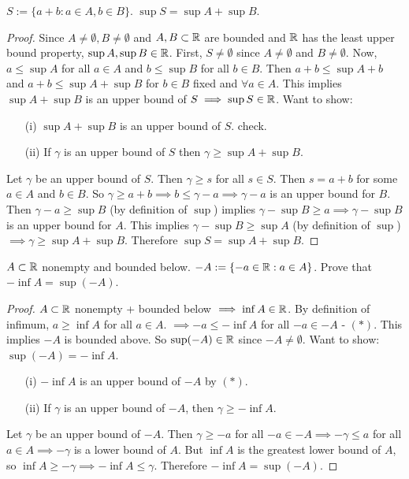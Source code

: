 \documentclass[]{article}
\begin{document}
\begin{example}
	[HW2.2] $S:=\{a+b:a\in A,b\in B\}$. $\sup S = \sup A + \sup B$.
	\begin{proof}
		Since $A\neq\emptyset,B\neq\emptyset$ and $A,B\subset \mathbb{R}$ are bounded and $\mathbb{R}$ has the least upper bound property, $\sup A,\sup B\in\mathbb{R}$.
		First, $S\neq\emptyset$ since $A\neq\emptyset$ and $B\neq\emptyset$. Now, $a\leq \sup A$ for all $a\in A$ and $b\leq \sup B$ for all $b\in B$.
		Then $a+b\leq\sup A+b$ and $a+b\leq \sup A + \sup B$ for $b\in B$ fixed and $\forall a\in A$. 
		This implies $\sup A+\sup B$ is an upper bound of $S \implies \sup S\in\mathbb{R}$.
		Want to show:
		\begin{enumerate}
			\item[(i)] $\sup A+\sup B$ is an upper bound of $S$. check.
			\item[(ii)] If $\gamma$ is an upper bound of $S$ then $\gamma\geq\sup A + \sup B$.
		\end{enumerate}
		Let $\gamma$ be an upper bound of $S$. Then $\gamma\geq s$ for all $s\in S$. Then $s = a+b$ for some $a\in A$ and $b\in B$.
		So $\gamma \geq a+b \implies b\leq \gamma-a \implies \gamma-a$ is an upper bound for $B$.
		Then $\gamma-a\geq \sup B$ (by definition of $\sup$) implies $\gamma-\sup B \geq a \implies \gamma-\sup B$ is an upper bound for $A$. This implies $\gamma-\sup B \geq \sup A$ (by definition of $\sup$) $\implies \gamma\geq \sup A + \sup B$.
		Therefore $\sup S = \sup A+\sup B$.
	\end{proof}
\end{example}
\begin{example}
	[HW2.3]
	$A\subset \mathbb{R}$ nonempty and bounded below. $-A:=\{-a\in \mathbb{R}:a\in A\}$.
	Prove that $-\inf A = \sup (-A)$.
	\begin{proof}
		$A\subset\mathbb{R}$ nonempty + bounded below $\implies \inf A\in\mathbb{R}$.
		By definition of infimum, $a\geq \inf A$ for all $a\in A$.
		$\implies -a\leq -\inf A$ for all $-a\in -A$ - $(*)$.
		This implies $-A$ is bounded above. So $\sup (-A)\in\mathbb{R}$ since $-A\neq\emptyset$.
		Want to show: $\sup(-A) = -\inf A$.
		\begin{enumerate}
			\item[(i)] $-\inf A$ is an upper bound of $-A$ by $(*)$.
			\item[(ii)] If $\gamma$ is an upper bound of $-A$, then $\gamma\geq -\inf A$.
		\end{enumerate}
		Let $\gamma$ be an upper bound of $-A$. Then $\gamma\geq -a$ for all $-a\in -A \implies -\gamma\leq a$ for all $a\in A \implies -\gamma$ is a lower bound of $A$. But $\inf A$ is the greatest lower bound of $A$, so $\inf A\geq -\gamma \implies -\inf A\leq \gamma$. Therefore $-\inf A = \sup (-A)$.
	\end{proof}
\end{example}
\end{document}
